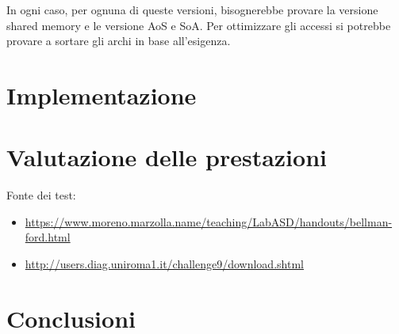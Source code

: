 \documentclass{article}
\begin{document}
	In ogni caso, per ognuna di queste versioni, bisognerebbe provare la versione shared memory e le versione AoS e SoA. Per ottimizzare gli accessi si potrebbe provare a sortare gli archi in base all'esigenza.
	
	\section{Implementazione}
	
	\section{Valutazione delle prestazioni}
	Fonte dei test:
	\begin{itemize}
		\item \url{https://www.moreno.marzolla.name/teaching/LabASD/handouts/bellman-ford.html}
		\item \url{http://users.diag.uniroma1.it/challenge9/download.shtml}
	\end{itemize}
	
	\section{Conclusioni}
	
\end{document}
